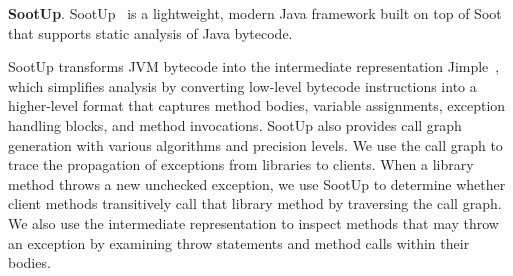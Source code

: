 \textbf{SootUp}. SootUp~\cite{Karakaya24:_SootUp} is a lightweight, modern Java framework built on top of Soot~\cite{vallee2010soot} that supports static analysis of Java bytecode.

SootUp transforms JVM bytecode into the intermediate representation Jimple~\cite{sootup}, which simplifies analysis by converting low-level bytecode instructions into a higher-level format that captures method bodies, variable assignments, exception handling blocks, and method invocations. SootUp also provides call graph generation with various algorithms and precision levels. We use the call graph to trace the propagation of exceptions from libraries to clients. When a library method throws a new unchecked exception, we use SootUp to determine whether client methods transitively call that library method by traversing the call graph. We also use the intermediate representation to inspect methods that may throw an exception by examining throw statements and method calls within their bodies.